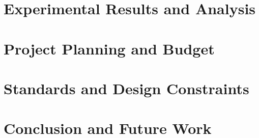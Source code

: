 \documentclass[12pt]{report}
\begin{document}
\chapter{Experimental Results and Analysis} \label{cha:results}



\chapter{Project Planning and Budget\label{cha:cost_time}}


\chapter{Standards and Design Constraints} \label{cha:AccreditationComponents}


\chapter{Conclusion and Future Work} \label{cha:ConclusionAndFutureWork}






% 

% 


% 

% 

% 
\end{document}
